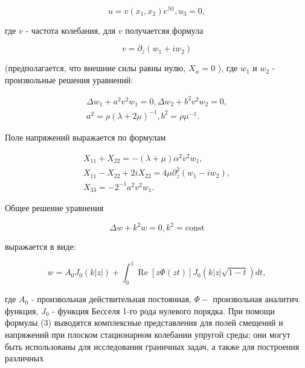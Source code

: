 \documentclass[10pt]{article}
\begin{document}
\[

u=v\left(x_{1}, x_{2}\right) e^{\dot{N} t}, u_{3}=0,

\]



где $v$ - частота колебания, для $v$ получаетсяя формула



\[

v=\partial_{\bar{z}}\left(w_{1}+i w_{2}\right)

\]



(предполагается, что внешние силы равны нулю, $X_{\alpha}=0$ ), где $w_{1}$ и $w_{2}$ - произвольные решения уравнений:



\[

\begin{gathered}

\Delta w_{1}+a^{2} v^{2} w_{1}=0, \Delta w_{2}+b^{2} v^{2} w_{2}=0, \\

a^{2}=\rho(\lambda+2 \mu)^{-1}, b^{2}=\rho \mu^{-1} .

\end{gathered}

\]



Поле напряжений выражается по формулам



\[

\begin{gathered}

X_{11}+X_{22}=-(\lambda+\mu) \alpha^{2} v^{2} w_{1}, \\

X_{11}-X_{22}+2 i X_{22}=4 \mu \partial_{\bar{z}}^{2}\left(w_{1}-i w_{2}\right), \\

X_{33}=-2^{-1} a^{2} v^{2} w_{1} .

\end{gathered}

\]



Общее решение уравнения



\[

\Delta w+k^{2} w=0, k^{2}=\mathrm{const}

\]



выражается в виде:



\[

w=A_{0} J_{0}(k|z|)+\int_{0}^{1} \operatorname{Re}[z \Phi(z t)] J_{0}(k|z| \sqrt{1-t}) d t,

\]



где $A_{0}$ - произвольная действительная постоянная, $\Phi-$ произвольная аналитич. функция, $J_{0}$ - функция Бесселя 1-го рода нулевого порядка. При помощи формулы (3) выводятся комплексные представления для полей смещений и напряжений при плоском стационарном колебании упругой среды; они могут быть использованы для исследования граничных задач, а также для построения различных
\end{document}

